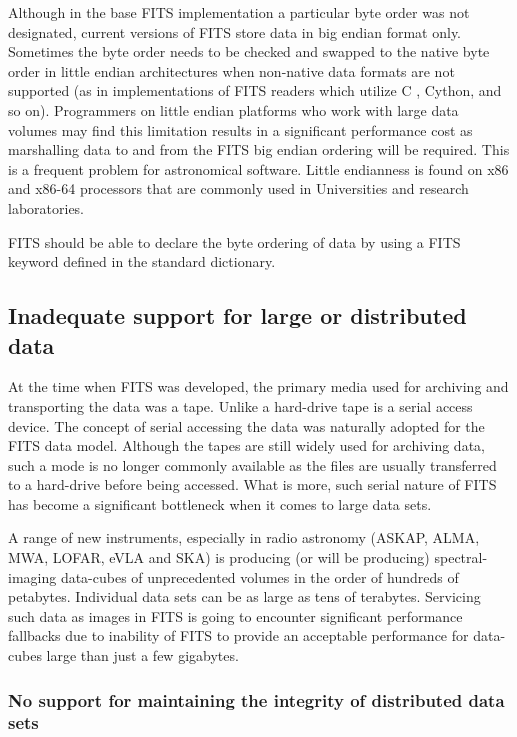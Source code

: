 \documentclass[final,authoryear,5p,times,twocolumn]{elsarticle}
\begin{document}
Although in the base FITS implementation \citep{1981A&AS...44..363W} a
particular byte order was not designated, current versions of FITS
store data in big endian format only. Sometimes the byte order needs
to be checked and swapped to the native byte order in little endian
architectures when non-native data formats are not supported (as in
implementations of FITS readers which utilize C , Cython, and so
on). Programmers on little endian platforms who work with large data
volumes may find this limitation results in a significant performance
cost as marshalling data to and from the FITS big endian ordering will
be required. This is a frequent problem for astronomical
software. Little endianness is found on x86 and x86-64 processors that
are commonly used in Universities and research laboratories.


FITS should be able to declare the byte ordering of data by using a
FITS keyword defined in the standard dictionary.


\subsection{Inadequate support for large or distributed data}

At the time when FITS was developed, the primary media used for
archiving and transporting the data was a tape. Unlike a hard-drive
tape is a serial access device.  The concept of serial accessing the
data was naturally adopted for the FITS data model.  Although the tapes
are still widely used for archiving data, such a mode is no longer
commonly available as the files are usually transferred to a
hard-drive before being accessed. What is more, such serial nature of
FITS has become a significant bottleneck when it comes to large data
sets.

A range of new instruments, especially in radio astronomy (ASKAP,
ALMA, MWA, LOFAR, eVLA and SKA) is producing (or will be producing)
spectral-imaging data-cubes of unprecedented volumes in the order of
hundreds of petabytes. Individual data sets can be as large as tens of
terabytes.  Servicing such data as images in FITS is going to encounter
significant performance fallbacks due to inability of FITS to provide
an acceptable performance for data-cubes large than just a few gigabytes.

\subsubsection{No support for maintaining the integrity of distributed data sets}
\end{document}
